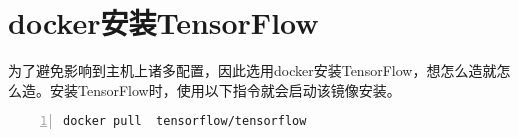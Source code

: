 \section{docker安装TensorFlow}
为了避免影响到主机上诸多配置，因此选用docker安装TensorFlow，想怎么造就怎么造。安装TensorFlow时，使用以下指令就会启动该镜像安装。
\begin{lstlisting}[language = shell, numbers=left, 
         numberstyle=\tiny,keywordstyle=\color{blue!70},
         commentstyle=\color{red!50!green!50!blue!50},frame=shadowbox,
         rulesepcolor=\color{red!20!green!20!blue!20},basicstyle=\ttfamily]
docker pull  tensorflow/tensorflow
\end{lstlisting}